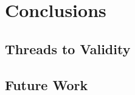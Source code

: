 \documentclass[english,12pt,a4paper,pdftex,sci,utf8]{aaltothesis}
\begin{document}
\section{Conclusions} \label{conclusions}
\subsection{Threads to Validity} \label{validity}
\subsection{Future Work} \label{future}

\clearpage

{}
\begin{thebibliography}{99}



  


\end{thebibliography}
\end{document}
